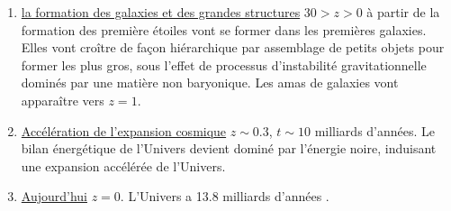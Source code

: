 \begin{enumerate}
\item \underline{la formation des galaxies et des grandes structures} $30>z>0$ à partir de la formation des première étoiles vont se former dans les premières galaxies. Elles vont croître de façon hiérarchique  par assemblage de petits objets pour former les plus gros, sous l'effet de processus d'instabilité gravitationnelle dominés par une matière non baryonique. Les amas de galaxies vont apparaître vers $z=1$.
\item \underline{Accélération de l'expansion cosmique} $z\sim 0.3$, $t\sim 10$ milliards d'années. Le bilan énergétique de l'Univers devient dominé par l'énergie noire, induisant une expansion accélérée de l'Univers.
\item \underline{Aujourd'hui} $z=0$. L'Univers a 13.8 milliards d'années .
\end{enumerate}


